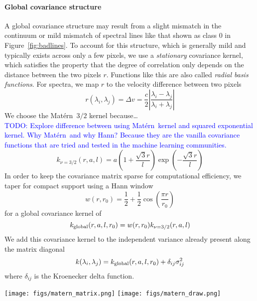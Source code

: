 \documentclass[iop,floatfix]{emulateapj}
\newcommand{\matern}{Mat\'{e}rn}
\newcommand{\todo}[1]{ \textcolor{Blue}{\\TODO: #1}}
\begin{document}
\paragraph{Global covariance structure}
A global covariance structure may result from a slight mismatch in the
 continuum or mild mismatch of spectral lines like that shown as class 0 in
 Figure~\ref{fig:badlines}. 
To account for this structure, which is generally mild and typically exists
 across only a few pixels, we use a \emph{stationary} covariance kernel, which
 satisfies the property that the degree of correlation only depends on the
 distance between the two pixels $r$. 
Functions like this are also called \emph{radial basis functions}. 
For spectra, we map $r$ to the velocity difference between two pixels
\begin{equation}
  r(\lambda_i, \lambda_j) = \Delta v = \frac{c}{2} \left | \frac{\lambda_i 
   - \lambda_j}{ \lambda_i + \lambda_j} \right |
\end{equation}
We choose the \matern\ $3/2$ kernel because\ldots
\todo{Explore difference between using \matern\ kernel and squared exponential
 kernel. 
Why \matern\ and why Hann? 
Because they are the vanilla covariance functions that are tried and tested in
 the machine learning communities.}
\begin{equation}
  k_{\nu = 3/2}(r, a, l) = a \left(1 + \frac{\sqrt{3} r}{l} \right ) \exp 
   \left (- \frac{\sqrt{3} r}{l} \right )
\end{equation}
In order to keep the covariance matrix sparse for computational efficiency, we
 taper for compact support using a Hann window
\begin{equation}
  w(r, r_0) = \frac{1}{2} + \frac{1}{2} \cos \left( \frac{\pi r}{r_0} \right) 
\end{equation}
for a global covariance kernel of 
\begin{equation}
  k_{\rm global} (r, a, l, r_0) = w(r, r_0) k_{\nu = 3/2}(r, a, l) 
  \label{eqn:global}
\end{equation}
We add this covariance kernel to the independent variance already present along
 the matrix diagonal
\begin{equation}
  k(\lambda_i, \lambda_j) = k_{\rm global}(r, a, l, r_0) + \delta_{ij} \sigma_{ij}^2
\end{equation}
where $\delta_{ij}$ is the Kroenecker delta function.

\begin{figure*}[!htb]
\begin{center}
\texttt{[image: figs/matern\_matrix.png]}
\texttt{[image: figs/matern\_draw.png]}
\caption{\textbf{Left} a covariance matrix generated with the \matern\ kernel
 and typical parameters for our dataset.  
 \textbf{Right} general spectroscopic residuals near a stellar continuum
  overlaid with a sample draw using the covariance matrix, showing that the two
  look similar in structure and amplitude. 
  \protect \todo{Prettify these figures. Consistent labelling. Change
  color stretch so Matrix zeros are white.}}
\label{fig:matern}
\end{center}
\end{figure*}
\end{document}
